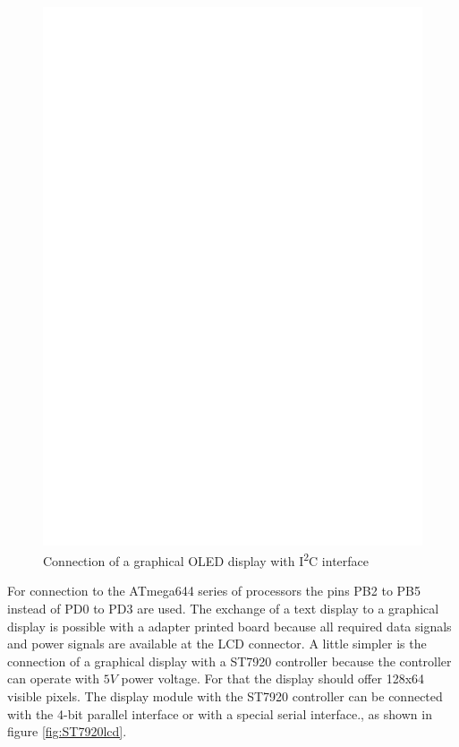 \begin{figure}[H]
\centering
\includegraphics[width=14cm]{../FIG/SSD1306_I2C.eps}
\caption{Connection of a graphical OLED display with I\textsuperscript{2}C interface}
\label{fig:ssd1306i2c}
\end{figure}

For connection to the ATmega644 series of processors the pins PB2 to PB5 instead of PD0 to PD3 are used.
The exchange of a text display to a graphical display is possible with a adapter printed board because
all required data signals and power signals are available at the LCD connector.
A little simpler is the connection of a graphical display with a ST7920 controller because
the controller can operate with \(5V\) power voltage.
For that the display should offer 128x64 visible pixels.
The display module with the ST7920 controller can be connected with the 4-bit parallel interface or with a
special serial interface., as shown in figure \ref{fig:ST7920lcd}.
 
